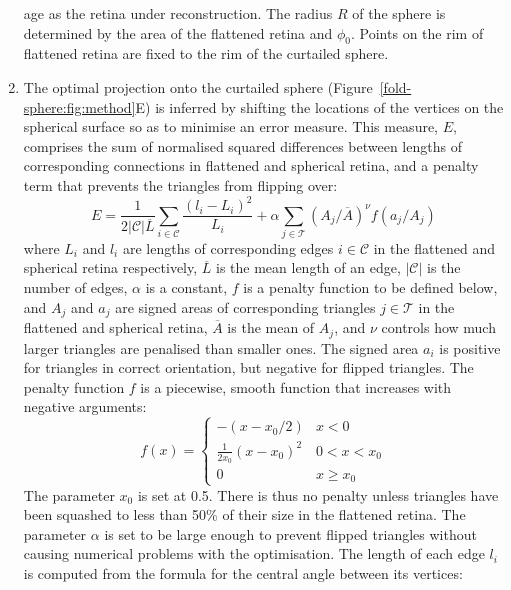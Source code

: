 \documentclass[10pt]{article}
\begin{document}
\begin{enumerate}
  age as the retina under reconstruction. The radius $R$ of the sphere
  is determined by the area of the flattened retina and $\phi_0$.
  Points on the rim of flattened retina are fixed to the rim of the
  curtailed sphere.
\item The optimal projection onto the curtailed sphere
  (Figure~\ref{fold-sphere:fig:method}E) is inferred by shifting the
  locations of the vertices on the spherical surface so as to minimise
  an error measure. This measure, $E$, comprises the sum of normalised
  squared differences between lengths of corresponding connections in
  flattened and spherical retina, and a penalty term that prevents the
  triangles from flipping over:
  \begin{equation}
    E = \frac{1}{2|\mathcal{C}|\overline{L}} \sum_{i\in\mathcal{C}} \frac{(l_i - L_i)^2}{L_i}  
    + \alpha\sum_{j\in\mathcal{T}} (A_j/\overline{A})^\nu f(a_j/A_j)
  \end{equation}
  where $L_i$ and $l_i$ are lengths of corresponding edges
  $i\in\mathcal{C}$ in the flattened and spherical retina
  respectively, $\overline{L}$ is the mean length of an edge,
  $|\mathcal{C}|$ is the number of edges, $\alpha$ is a constant, $f$
  is a penalty function to be defined below, and $A_j$ and $a_j$ are
  signed areas of corresponding triangles $j\in\mathcal{T}$ in the
  flattened and spherical retina, $\overline{A}$ is the mean of $A_j$,
  and $\nu$ controls how much larger triangles are penalised than
  smaller ones.  The signed area $a_i$ is positive for triangles in
  correct orientation, but negative for flipped triangles. The penalty
  function $f$ is a piecewise, smooth function that increases with
  negative arguments:
  \begin{equation}
    \label{retistruct_plos:eq:1}
    f(x) = \left\{
        \begin{array}{ll}
          -(x - x_0/2) & x < 0 \\
          \frac{1}{2x_0}(x - x_0)^2 & 0 < x <x_0 \\
          0 & x \ge x_0
          \end{array} \right.
  \end{equation}
  The parameter $x_0$ is set at 0.5. There is thus no penalty unless
  triangles have been squashed to less than 50\% of their size in the
  flattened retina.  The parameter $\alpha$ is set to be large enough
  to prevent flipped triangles without causing numerical problems with
  the optimisation. The length of each edge $l_i$ is computed from the
  formula for the central angle between its vertices:

\end{enumerate}
\end{document}
